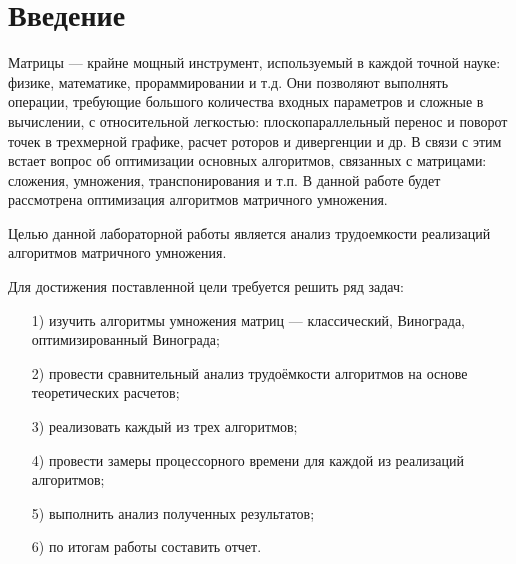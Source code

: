 
\chapter*{Введение}

Матрицы --- крайне мощный инструмент, используемый в каждой точной науке: физике, математике, прораммировании и т.д.
Они позволяют выполнять операции, требующие большого количества входных параметров и сложные в вычислении, с относительной легкостью: плоскопараллельный перенос и поворот точек в трехмерной графике, расчет роторов и дивергенции и др.
В связи с этим встает вопрос об оптимизации основных алгоритмов, связанных с матрицами: сложения, умножения, транспонирования и т.п.
В данной работе будет рассмотрена оптимизация алгоритмов матричного умножения.

Целью данной лабораторной работы является анализ трудоемкости реализаций алгоритмов матричного умножения.

Для достижения поставленной цели требуется решить ряд задач:
\begin{enumerate}
	\item[1)] изучить алгоритмы умножения матриц --- классический, Винограда, оптимизированный Винограда;
	\item[2)] провести сравнительный анализ трудоёмкости алгоритмов на основе теоретических расчетов;
	\item[3)] реализовать каждый из трех алгоритмов;
	\item[4)] провести замеры процессорного времени для каждой из реализаций алгоритмов;
	\item[5)] выполнить анализ полученных результатов;
	\item[6)] по итогам работы составить отчет.
\end{enumerate}

\newpage
